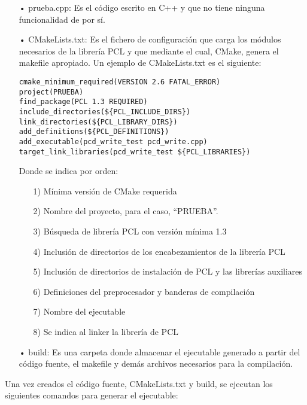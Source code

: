 \begin{itemize}
\item[•]prueba.cpp: Es el código escrito en C++ y que no tiene ninguna funcionalidad de por sí. 

\item[•]CMakeLists.txt: Es el fichero de configuración que carga los módulos necesarios de la librería PCL y que mediante el cual, CMake, genera el makefile apropiado. Un ejemplo de CMakeLists.txt es el siguiente\cite{ejecutable}:

\begin{lstlisting}
cmake_minimum_required(VERSION 2.6 FATAL_ERROR)	
project(PRUEBA)	
find_package(PCL 1.3 REQUIRED)	
include_directories(${PCL_INCLUDE_DIRS})	
link_directories(${PCL_LIBRARY_DIRS})	
add_definitions(${PCL_DEFINITIONS})	
add_executable(pcd_write_test pcd_write.cpp)	
target_link_libraries(pcd_write_test ${PCL_LIBRARIES})	
\end{lstlisting}

Donde se indica por orden: 

\begin{itemize}
\item[1)]Mínima versión de CMake requerida
\item[2)]Nombre del proyecto, para el caso, ``PRUEBA''.
\item[3)]Búsqueda de librería PCL con versión mínima 1.3
\item[4)]Inclusión de directorios de los encabezamientos de la librería PCL
\item[5)]Inclusión de directorios de instalación de PCL y las librerías auxiliares
\item[6)]Definiciones del preprocesador y banderas de compilación
\item[7)]Nombre del ejecutable 
\item[8)]Se indica al linker la librería de PCL
\end{itemize}

\item[•]build: Es una carpeta donde almacenar el ejecutable generado a partir del código fuente, el makefile y demás archivos necesarios para la compilación.
\end{itemize}

Una vez creados el código fuente, CMakeLists.txt y build, se ejecutan los siguientes comandos para generar el ejecutable:

